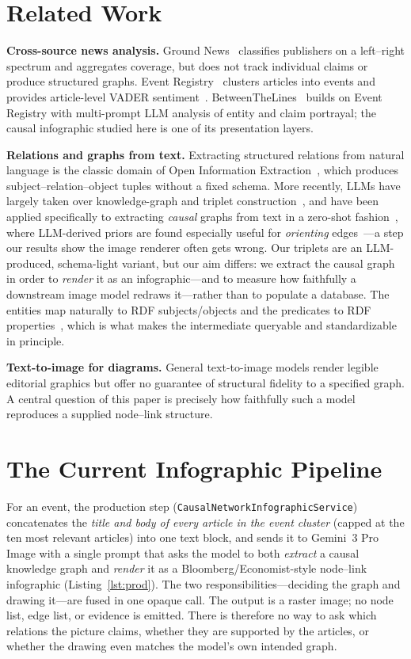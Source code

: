 \documentclass[sigconf,natbib=false, language=english]{acmart}
\begin{document}
\section{Related Work}
\textbf{Cross-source news analysis.} Ground News~\cite{groundnews_harford,groundnews_wvu} classifies publishers on a left--right spectrum and aggregates coverage, but does not track individual claims or produce structured graphs. Event Registry~\cite{leban2014event,eventregistry} clusters articles into events and provides article-level VADER sentiment~\cite{hutto2014vader}. BetweenTheLines~\cite{betweenthelines} builds on Event Registry with multi-prompt LLM analysis of entity and claim portrayal; the causal infographic studied here is one of its presentation layers.

\textbf{Relations and graphs from text.} Extracting structured relations from natural language is the classic domain of Open Information Extraction~\cite{banko2007openie,fader2011reverb}, which produces subject--relation--object tuples without a fixed schema. More recently, LLMs have largely taken over knowledge-graph and triplet construction~\cite{bian2025kgsurvey}, and have been applied specifically to extracting \emph{causal} graphs from text in a zero-shot fashion~\cite{antonucci2024causal}, where LLM-derived priors are found especially useful for \emph{orienting} edges~\cite{darvariu2024priors}---a step our results show the image renderer often gets wrong. Our triplets are an LLM-produced, schema-light variant, but our aim differs: we extract the causal graph in order to \emph{render} it as an infographic---and to measure how faithfully a downstream image model redraws it---rather than to populate a database. The entities map naturally to RDF subjects/objects and the predicates to RDF properties~\cite{rdf11}, which is what makes the intermediate queryable and standardizable in principle.

\textbf{Text-to-image for diagrams.} General text-to-image models render legible editorial graphics but offer no guarantee of structural fidelity to a specified graph. A central question of this paper is precisely how faithfully such a model reproduces a supplied node--link structure.

\section{The Current Infographic Pipeline}
For an event, the production step (\texttt{CausalNetworkInfographicService}) concatenates the \emph{title and body of every article in the event cluster} (capped at the ten most relevant articles) into one text block, and sends it to Gemini~3 Pro Image with a single prompt that asks the model to both \emph{extract} a causal knowledge graph and \emph{render} it as a Bloomberg/Economist-style node--link infographic (Listing~\ref{lst:prod}). The two responsibilities---deciding the graph and drawing it---are fused in one opaque call. The output is a raster image; no node list, edge list, or evidence is emitted. There is therefore no way to ask which relations the picture claims, whether they are supported by the articles, or whether the drawing even matches the model's own intended graph.
\end{document}
